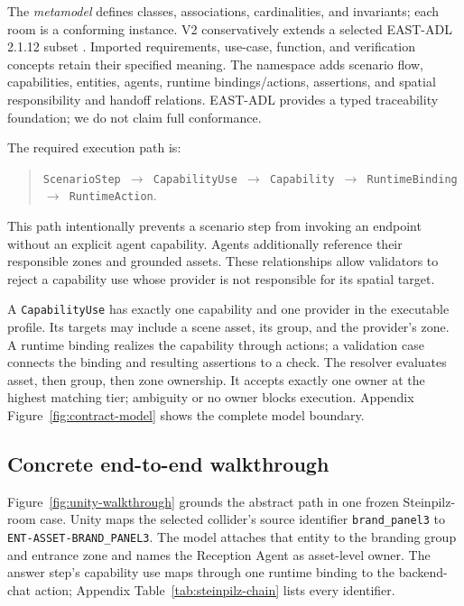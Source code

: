 The \emph{metamodel} defines classes, associations, cardinalities, and
invariants; each room is a conforming instance. V2 conservatively extends a
selected EAST-ADL 2.1.12 subset \cite{eastadl2013spec}. Imported requirements,
use-case, function, and verification concepts retain their specified meaning.
The \systemname{} namespace adds scenario flow, capabilities, entities, agents,
runtime bindings/actions, assertions, and spatial responsibility and handoff
relations. EAST-ADL provides a typed traceability foundation; we do not claim
full conformance.

The required execution path is:

\begin{quote}
\texttt{ScenarioStep $\rightarrow$ CapabilityUse $\rightarrow$ Capability
$\rightarrow$ RuntimeBinding $\rightarrow$ RuntimeAction}.
\end{quote}

This path intentionally prevents a scenario step from invoking an endpoint
without an explicit agent capability. Agents additionally reference their
responsible zones and grounded assets. These relationships allow validators to
reject a capability use whose provider is not responsible for its spatial
target.

A \texttt{CapabilityUse} has exactly one capability and one provider in the
executable profile. Its targets may include a scene asset, its group, and the
provider's zone. A runtime binding realizes the capability through actions; a
validation case connects the binding and resulting assertions to a check. The
resolver evaluates asset, then group, then zone ownership. It accepts exactly
one owner at the highest matching tier; ambiguity or no owner blocks execution.
Appendix Figure~\ref{fig:contract-model} shows the complete model boundary.

\subsection{Concrete end-to-end walkthrough}



Figure~\ref{fig:unity-walkthrough} grounds the abstract path in one frozen
Steinpilz-room case. Unity maps the selected collider's source identifier
\texttt{brand\_panel3} to \texttt{ENT-ASSET-BRAND\_PANEL3}. The model attaches
that entity to the branding group and entrance zone and names the Reception
Agent as asset-level owner. The answer step's capability use maps through one
runtime binding to the backend-chat action; Appendix
Table~\ref{tab:steinpilz-chain} lists every identifier.

